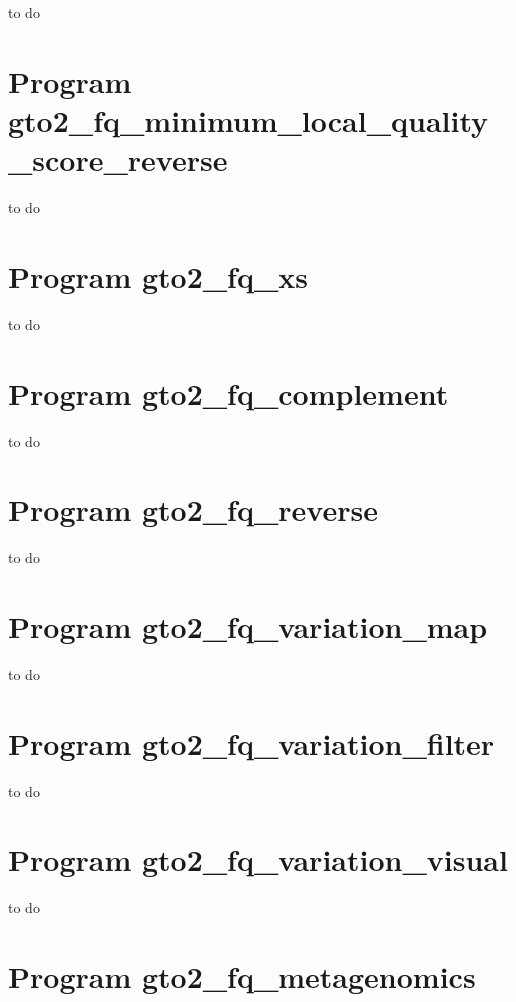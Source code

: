 \documentclass[11pt,]{krantz}
\begin{document}
to do

\section{Program
gto2\_fq\_minimum\_local\_quality\_score\_reverse}\label{program-gto2_fq_minimum_local_quality_score_reverse}

to do

\section{Program gto2\_fq\_xs}\label{program-gto2_fq_xs}

to do

\section{Program gto2\_fq\_complement}\label{program-gto2_fq_complement}

to do

\section{Program gto2\_fq\_reverse}\label{program-gto2_fq_reverse}

to do

\section{Program
gto2\_fq\_variation\_map}\label{program-gto2_fq_variation_map}

to do

\section{Program
gto2\_fq\_variation\_filter}\label{program-gto2_fq_variation_filter}

to do

\section{Program
gto2\_fq\_variation\_visual}\label{program-gto2_fq_variation_visual}

to do

\section{Program
gto2\_fq\_metagenomics}\label{program-gto2_fq_metagenomics}
\end{document}
